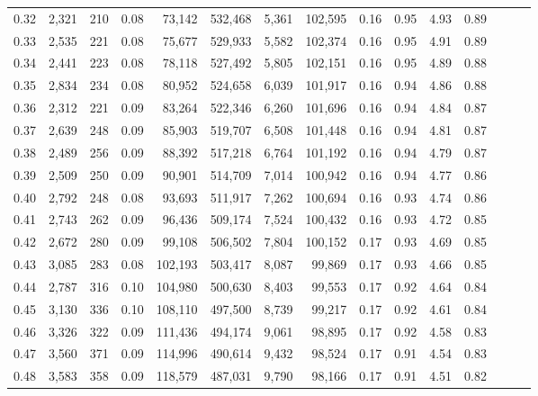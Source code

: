 \begin{tabular}{rrrrrrrrrrrrrrr}
0.32 &   2,321 &    210 &  0.08 &   73,142 &  532,468 &    5,361 &  102,595 &  0.16 &  0.95 &  4.93 &      0.89 \\
0.33 &   2,535 &    221 &  0.08 &   75,677 &  529,933 &    5,582 &  102,374 &  0.16 &  0.95 &  4.91 &      0.89 \\
0.34 &   2,441 &    223 &  0.08 &   78,118 &  527,492 &    5,805 &  102,151 &  0.16 &  0.95 &  4.89 &      0.88 \\
0.35 &   2,834 &    234 &  0.08 &   80,952 &  524,658 &    6,039 &  101,917 &  0.16 &  0.94 &  4.86 &      0.88 \\
0.36 &   2,312 &    221 &  0.09 &   83,264 &  522,346 &    6,260 &  101,696 &  0.16 &  0.94 &  4.84 &      0.87 \\
0.37 &   2,639 &    248 &  0.09 &   85,903 &  519,707 &    6,508 &  101,448 &  0.16 &  0.94 &  4.81 &      0.87 \\
0.38 &   2,489 &    256 &  0.09 &   88,392 &  517,218 &    6,764 &  101,192 &  0.16 &  0.94 &  4.79 &      0.87 \\
0.39 &   2,509 &    250 &  0.09 &   90,901 &  514,709 &    7,014 &  100,942 &  0.16 &  0.94 &  4.77 &      0.86 \\
0.40 &   2,792 &    248 &  0.08 &   93,693 &  511,917 &    7,262 &  100,694 &  0.16 &  0.93 &  4.74 &      0.86 \\
0.41 &   2,743 &    262 &  0.09 &   96,436 &  509,174 &    7,524 &  100,432 &  0.16 &  0.93 &  4.72 &      0.85 \\
0.42 &   2,672 &    280 &  0.09 &   99,108 &  506,502 &    7,804 &  100,152 &  0.17 &  0.93 &  4.69 &      0.85 \\
0.43 &   3,085 &    283 &  0.08 &  102,193 &  503,417 &    8,087 &   99,869 &  0.17 &  0.93 &  4.66 &      0.85 \\
0.44 &   2,787 &    316 &  0.10 &  104,980 &  500,630 &    8,403 &   99,553 &  0.17 &  0.92 &  4.64 &      0.84 \\
0.45 &   3,130 &    336 &  0.10 &  108,110 &  497,500 &    8,739 &   99,217 &  0.17 &  0.92 &  4.61 &      0.84 \\
0.46 &   3,326 &    322 &  0.09 &  111,436 &  494,174 &    9,061 &   98,895 &  0.17 &  0.92 &  4.58 &      0.83 \\
0.47 &   3,560 &    371 &  0.09 &  114,996 &  490,614 &    9,432 &   98,524 &  0.17 &  0.91 &  4.54 &      0.83 \\
0.48 &   3,583 &    358 &  0.09 &  118,579 &  487,031 &    9,790 &   98,166 &  0.17 &  0.91 &  4.51 &      0.82 \\

\end{tabular}
